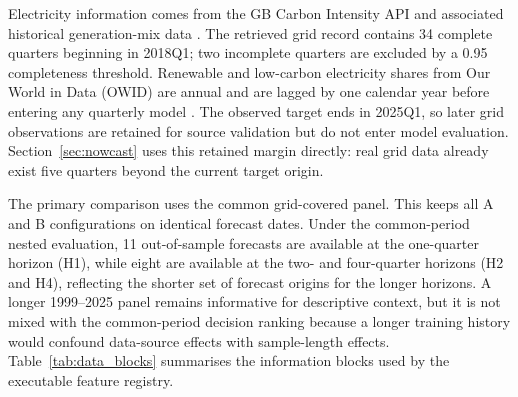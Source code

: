 \documentclass[preprint,12pt]{elsarticle}
\begin{document}
Electricity information comes from the GB Carbon Intensity API and associated historical generation-mix data \citep{neso2026}. The retrieved grid record contains 34 complete quarters beginning in 2018Q1; two incomplete quarters are excluded by a 0.95 completeness threshold. Renewable and low-carbon electricity shares from Our World in Data (OWID) are annual and are lagged by one calendar year before entering any quarterly model \citep{owidrenewables2026,owidlowcarbon2026}. The observed target ends in 2025Q1, so later grid observations are retained for source validation but do not enter model evaluation. Section~\ref{sec:nowcast} uses this retained margin directly: real grid data already exist five quarters beyond the current target origin.

The primary comparison uses the common grid-covered panel. This keeps all A and B configurations on identical forecast dates. Under the common-period nested evaluation, 11 out-of-sample forecasts are available at the one-quarter horizon (H1), while eight are available at the two- and four-quarter horizons (H2 and H4), reflecting the shorter set of forecast origins for the longer horizons. A longer 1999--2025 panel remains informative for descriptive context, but it is not mixed with the common-period decision ranking because a longer training history would confound data-source effects with sample-length effects. Table~\ref{tab:data_blocks} summarises the information blocks used by the executable feature registry.
\end{document}
